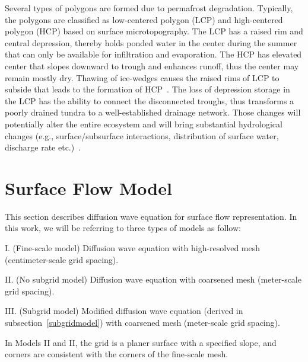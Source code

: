 \documentclass[review,11pt]{elsarticle}
\begin{document}
Several types of polygons are formed due to permafrost degradation. Typically, the polygons are classified as low-centered polygon (LCP) and high-centered polygon (HCP) based on surface microtopography. The LCP has a raised rim and central depression, thereby holds ponded water in the center during the summer that can only be available for infiltration and evaporation. The HCP has elevated center that slopes downward to trough and enhances runoff, thus the center may remain mostly dry. 
Thawing of ice-wedges causes the raised rims of LCP to subside that leads to the formation of HCP~\cite{jorgenson2006abrupt}. The loss of depression storage in the LCP has the ability to connect the disconnected troughs, thus transforms a poorly drained tundra to a well-established drainage network. Those changes will potentially alter the entire ecosystem and will bring substantial hydrological changes (e.g., surface/subsurface interactions, distribution of surface water, discharge rate etc.)~\cite{liljedahl2016pan, hinzman2005evidence,rowland2010arctic,liljedahl2012ice}.



\section{Surface Flow Model}\label{surf-flow-system}
This section describes diffusion wave equation for surface flow representation. In this work, we will be referring to three types of models as follow:
\begin{description}\itemsep0pt \parskip0pt
\item I. (Fine-scale model) Diffusion wave equation with high-resolved mesh (centimeter-scale grid spacing).
\item II. (No subgrid model) Diffusion wave equation with coarsened mesh (meter-scale grid spacing).
\item III. (Subgrid model) Modified diffusion wave equation (derived in subsection~\ref{subgridmodel}) with coarsened mesh (meter-scale grid spacing).
\end{description}
In Models II and II, the grid is a planer surface with a specified slope, and corners are consistent with the corners of the fine-scale mesh.
\end{document}
